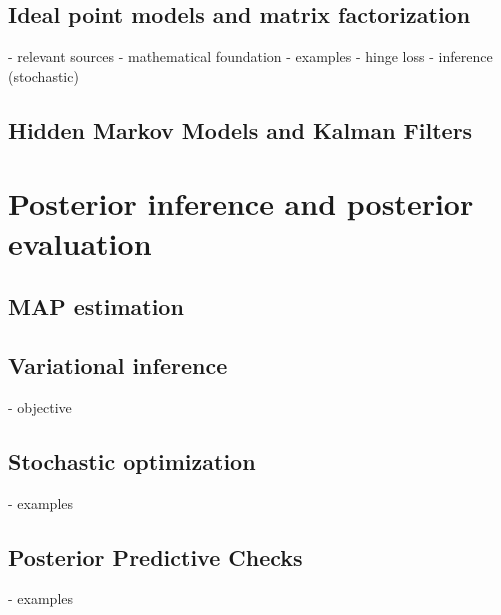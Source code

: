 \subsection{Ideal point models and matrix factorization}

  - relevant sources
  - mathematical foundation
  - examples
  - hinge loss
  - inference (stochastic)

\subsection{Hidden Markov Models and Kalman Filters}

\section{Posterior inference and posterior evaluation}

\subsection{MAP estimation}

\subsection{Variational inference}
  - objective

\subsection{Stochastic optimization}
  - examples

\subsection{Posterior Predictive Checks}
  - examples
